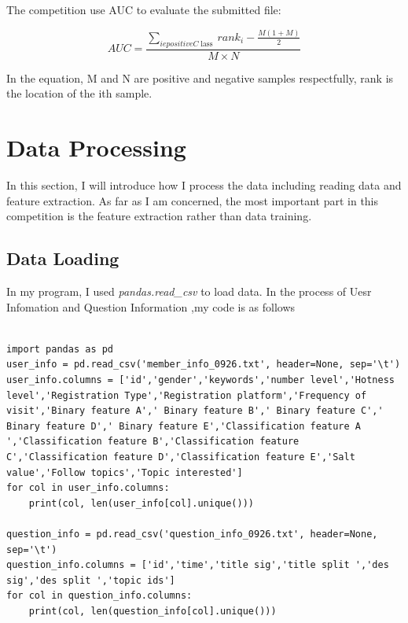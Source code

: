 \documentclass[sigconf]{acmart}
\begin{document}
The competition use AUC to evaluate the submitted file:

$$
A U C=\frac{\sum_{i e p o s i t i v e C \operatorname{lass}} r a n k_{i}-\frac{M(1+M)}{2}}{M \times N}
$$

In the equation, M and N are positive and negative samples respectfully, rank is the location of the ith sample.


\section{Data Processing}

In this section, I will introduce how I process the data including reading data and feature extraction. As far as I am concerned, the most important part in this competition is the feature extraction rather than data training.

\subsection{Data Loading}

In my program, I used \textit{pandas.read\_csv} to load data.
In the process of Uesr Infomation and Question Information ,my code is as follows

\begin{lstlisting}

import pandas as pd
user_info = pd.read_csv('member_info_0926.txt', header=None, sep='\t')
user_info.columns = ['id','gender','keywords','number level','Hotness level','Registration Type','Registration platform','Frequency of visit','Binary feature A',' Binary feature B',' Binary feature C',' Binary feature D',' Binary feature E','Classification feature A ','Classification feature B','Classification feature C','Classification feature D','Classification feature E','Salt value','Follow topics','Topic interested']
for col in user_info.columns:
    print(col, len(user_info[col].unique()))
    
question_info = pd.read_csv('question_info_0926.txt', header=None, sep='\t')
question_info.columns = ['id','time','title sig','title split ','des sig','des split ','topic ids']
for col in question_info.columns:
    print(col, len(question_info[col].unique()))

\end{lstlisting}
\end{document}
